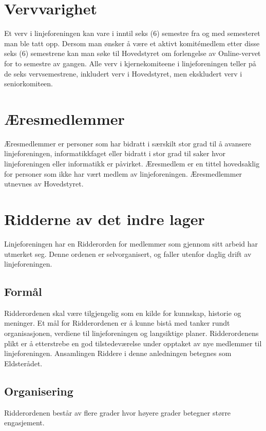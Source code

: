 \section{Vervvarighet}
\vspace{23pt}

Et verv i linjeforeningen kan vare i inntil seks (6) semestre fra og med semesteret man ble tatt opp. Dersom man ønsker å være et aktivt komitémedlem etter disse seks (6) semestrene kan man søke til Hovedstyret om forlengelse av Online-vervet for to semestre av gangen. Alle verv i kjernekomiteene i linjeforeningen teller på de seks vervsemestrene, inkludert verv i Hovedstyret, men ekskludert verv i seniorkomiteen.

\section{Æresmedlemmer}
\vspace{23pt}

Æresmedlemmer er personer som har bidratt i særskilt stor grad til å avansere linjeforeningen, informatikkfaget eller bidratt i stor grad til saker hvor linjeforeningen eller informatikk er påvirket.
Æresmedlem er en tittel hovedsaklig for personer som ikke har vært medlem av linjeforeningen.
Æresmedlemmer utnevnes av Hovedstyret.

\section{Ridderne av det indre lager}
\vspace{23pt}

Linjeforeningen har en Ridderorden for medlemmer som gjennom sitt arbeid har utmerket seg. Denne ordenen er selvorganisert, og faller utenfor daglig drift av linjeforeningen.

\subsection{Formål}
Ridderordenen skal være tilgjengelig som en kilde for kunnskap, historie og meninger. Et mål for Ridderordenen er å kunne bistå med tanker rundt organisasjonen, verdiene til linjeforeningen og langsiktige planer.
Ridderordenens plikt er å etterstrebe en god tilstedeværelse under opptaket av nye medlemmer til linjeforeningen. Ansamlingen Riddere i denne anledningen betegnes som Eldsterådet.


\subsection{Organisering}{
Ridderordenen består av flere grader hvor høyere grader betegner større engasjement.
}

